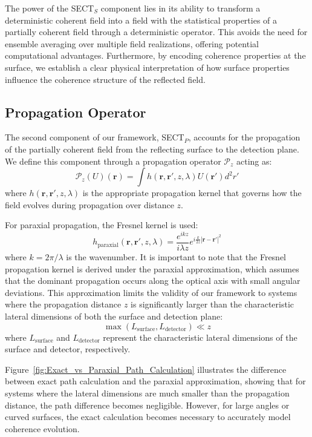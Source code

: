 \documentclass[a4paper,12pt]{article}
\begin{document}
The power of the SECT$_S$ component lies in its ability to transform a deterministic coherent field into a field with the statistical properties of a partially coherent field through a deterministic operator. This avoids the need for ensemble averaging over multiple field realizations, offering potential computational advantages. Furthermore, by encoding coherence properties at the surface, we establish a clear physical interpretation of how surface properties influence the coherence structure of the reflected field.

\subsection{Propagation Operator} \label{sec:Propagation_Operator}

The second component of our framework, SECT$_P$, accounts for the propagation of the partially coherent field from 
the reflecting surface to the detection plane. We define this component through a propagation operator $\mathcal{P}_z$ 
acting as:
\begin{equation}
\mathcal{P}_z(U)(\bm{r}) = \int h(\bm{r}, \bm{r}', z, \lambda) U(\bm{r}') d^2r'
\end{equation}
where $h(\bm{r}, \bm{r}', z, \lambda)$ is the appropriate propagation kernel that governs how the field evolves during 
propagation over distance $z$. 

For paraxial propagation, the Fresnel kernel is used:
\begin{equation}
h_{\text{paraxial}}(\bm{r}, \bm{r}', z, \lambda) = \frac{e^{ikz}}{i\lambda z} e^{i\frac{k}{2z}|\bm{r} - \bm{r}'|^2}
\end{equation}
where $k = 2\pi/\lambda$ is the wavenumber. It is important to note that the Fresnel propagation kernel is derived under the paraxial approximation, which assumes that the dominant propagation occurs along the optical axis with small angular deviations. This approximation limits the validity of our framework to systems where the propagation distance $z$ is significantly larger than the characteristic lateral dimensions of both the surface and detection plane:
\begin{equation}
\max(L_{\text{surface}}, L_{\text{detector}}) \ll z
\end{equation}
where $L_{\text{surface}}$ and $L_{\text{detector}}$ represent the characteristic lateral dimensions of the surface and 
detector, respectively.

Figure~\ref{fig:Exact_vs_Paraxial_Path_Calculation} illustrates the difference between exact path calculation and the paraxial approximation, showing that for systems where the lateral dimensions are much smaller than the propagation distance, the path difference becomes negligible. However, for large angles or curved surfaces, the exact calculation becomes necessary to accurately model coherence evolution.
\end{document}
